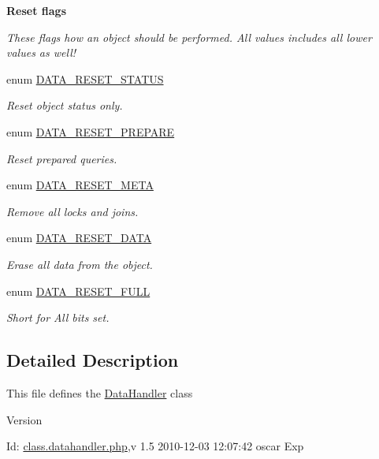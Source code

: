 \begin{Indent}{\bf Reset flags}\par
{\em \label{_amgrp143448a659afeaa8616ca6e3acdb751b}
 These flags how an object should be performed. All values includes all lower values as well! }\begin{DoxyCompactItemize}
\item 
enum \hyperlink{class_8datahandler_8php_a9266811d651cb3ff8c5fdf00111e677b}{DATA\_\-RESET\_\-STATUS} 
\begin{DoxyCompactList}\small\item\em Reset object status only. \item\end{DoxyCompactList}\item 
enum \hyperlink{class_8datahandler_8php_a19a99423705b41e563424ae76d7fe184}{DATA\_\-RESET\_\-PREPARE} 
\begin{DoxyCompactList}\small\item\em Reset prepared queries. \item\end{DoxyCompactList}\item 
enum \hyperlink{class_8datahandler_8php_a3ce9f928f9ba75096925bd4157246bbb}{DATA\_\-RESET\_\-META} 
\begin{DoxyCompactList}\small\item\em Remove all locks and joins. \item\end{DoxyCompactList}\item 
enum \hyperlink{class_8datahandler_8php_a7c6305f5e748976aa75d367420a408ea}{DATA\_\-RESET\_\-DATA} 
\begin{DoxyCompactList}\small\item\em Erase all data from the object. \item\end{DoxyCompactList}\item 
enum \hyperlink{class_8datahandler_8php_a2a28429433990da242faa223d5a49f0a}{DATA\_\-RESET\_\-FULL} 
\begin{DoxyCompactList}\small\item\em Short for All bits set. \item\end{DoxyCompactList}\end{DoxyCompactItemize}
\end{Indent}


\subsection{Detailed Description}
This file defines the \hyperlink{classDataHandler}{DataHandler} class \begin{DoxyVersion}{Version}

\end{DoxyVersion}
\begin{DoxyParagraph}{Id:}
\hyperlink{class_8datahandler_8php}{class.datahandler.php},v 1.5 2010-\/12-\/03 12:07:42 oscar Exp 
\end{DoxyParagraph}


